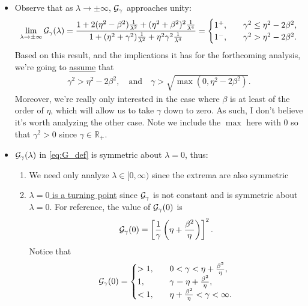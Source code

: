 \documentclass[a4paper,10pt]{article}
\begin{document}
{\begin{itemize}
\item Observe that as $\lambda \to \pm \infty$, ${\cal G}_{\gamma}$ approaches unity:
\begin{align}
\label{eq:Gunity}
\lim \limits_{\lambda \to \pm \infty} {\cal G}_{\gamma}(\lambda) 
= 
\frac{1 + 2(\eta^2 - \beta^2)\tfrac{1}{\lambda^2} + (\eta^2 + \beta^2)^2\tfrac{1}{\lambda^4}}{1 + (\eta^2 + \gamma^2)\tfrac{1}{\lambda^2} + \eta^2 \gamma^2 \tfrac{1}{\lambda^4}} 
=
\begin{cases}
1^{+}, \quad &\gamma^2 \leq \eta^2 - 2 \beta^2, \\
1^{-}, \quad &\gamma^2 > \eta^2 - 2 \beta^2.
\end{cases}
\end{align}
Based on this result, and the implications it has for the forthcoming analysis, we're going to \underline{assume} that 
\begin{align} 
\label{eq:gam_ass}
\gamma^2 > \eta^2 - 2 \beta^2, 
\quad
\textrm{and}
\quad
\gamma > \sqrt{\max(0, \eta^2 - 2 \beta^2)}.
\end{align}
Moreover, we're really only interested in the case where $\beta$ is at least of the order of $\eta$, which will allow us to take $\gamma$ down to zero. As such, I don't believe it's worth analyzing the other case.
Note we include the $\max$ here with 0 so that $\gamma^2  > 0$ since $\gamma \in \mathbb{R}_+$.

\item ${\cal G}_{\gamma}(\lambda)$ in \eqref{eq:G_def} is symmetric about $\lambda  = 0$, thus:
\begin{enumerate}
\setlength \itemsep{1ex}

\item We need only analyze $\lambda \in [0, \infty)$ since the extrema are also symmetric

\item \underline{$\lambda = 0$ is a turning point} since ${\cal G}_{\gamma}$ is not constant and is symmetric about $\lambda = 0$. For reference, the value of ${\cal G}_{\gamma}(0)$ is
\begin{align} \label{eq:G0}
{\cal G}_{\gamma}(0) = \left[ \frac{1}{\gamma} \left( \eta +  \frac{\beta^2}{\eta} \right) \right]^2.
\end{align}
Notice that
\begin{align}
\label{eq:G0_sizes}
{\cal G}_{\gamma}(0) 
=
\begin{cases}
> 1, \quad &0 < \gamma <  \eta +  \frac{\beta^2}{\eta}, \\
1, \quad &\gamma =  \eta +  \frac{\beta^2}{\eta}, \\
< 1, \quad  &\eta +  \frac{\beta^2}{\eta} < \gamma < \infty.
\end{cases}
\end{align}
\end{enumerate}



\end{itemize}}
\end{document}
